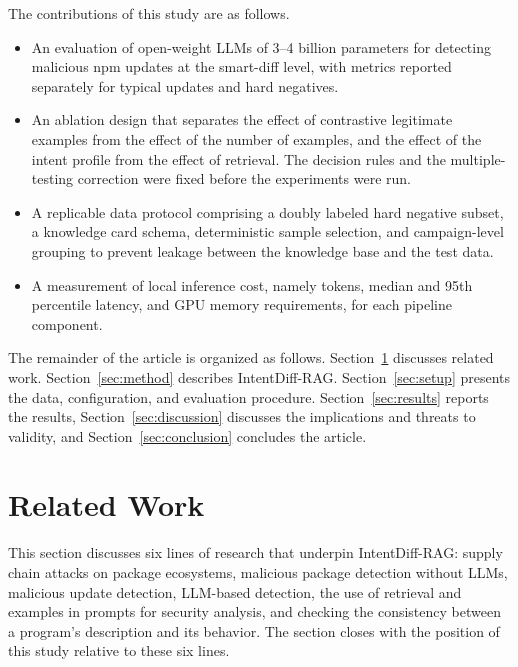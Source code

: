 \documentclass[a4paper,fleqn]{cas-dc}
\begin{document}
The contributions of this study are as follows.

\begin{itemize}
\item An evaluation of open-weight LLMs of 3--4 billion parameters for detecting malicious npm updates at the smart-diff level, with metrics reported separately for typical updates and hard negatives.
\item An ablation design that separates the effect of contrastive legitimate examples from the effect of the number of examples, and the effect of the intent profile from the effect of retrieval. The decision rules and the multiple-testing correction were fixed before the experiments were run.
\item A replicable data protocol comprising a doubly labeled hard negative subset, a knowledge card schema, deterministic sample selection, and campaign-level grouping to prevent leakage between the knowledge base and the test data.
\item A measurement of local inference cost, namely tokens, median and 95th
percentile latency, and GPU memory requirements, for each pipeline component.
\end{itemize}


The remainder of the article is organized as follows.
Section~\ref{sec:related} discusses related work. Section~\ref{sec:method}
describes IntentDiff-RAG. Section~\ref{sec:setup} presents the data,
configuration, and evaluation procedure. Section~\ref{sec:results} reports the
results, Section~\ref{sec:discussion} discusses the implications and threats to
validity, and Section~\ref{sec:conclusion} concludes the article.

\section{Related Work}\label{sec:related}


This section discusses six lines of research that underpin IntentDiff-RAG:
supply chain attacks on package ecosystems, malicious package detection without
LLMs, malicious update detection, LLM-based detection, the use of retrieval and
examples in prompts for security analysis, and checking the consistency between a
program's description and its behavior. The section closes with the position of
this study relative to these six lines.
\end{document}
